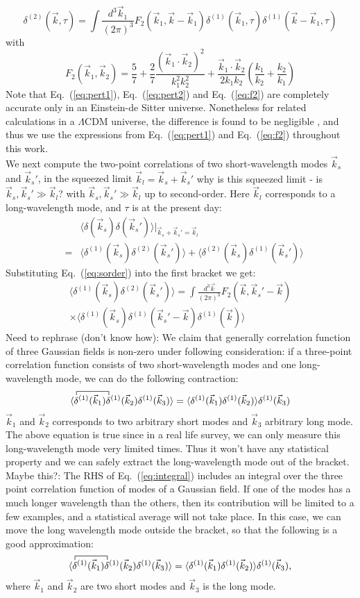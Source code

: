 \documentclass[prd,amsmath,amssymb,floatfix,superscriptaddress,nofootinbib,twocolumn]{revtex4-1}
\def\be{\begin{equation}}
\def\ee{\end{equation}}
\def\bea{\begin{eqnarray}}
\def\eea{\end{eqnarray}}
\newcommand{\vs}{\nonumber\\}
\newcommand{\vk}{\vec{k}}
\newcommand{\ec}[1]{Eq.~(\ref{eq:#1})}
\newcommand{\eql}[1]{\label{eq:#1}}
\newcommand{\peikai}[1]{{\color{blue} #1}}
\newcommand{\RC}[1]{{\color{darkorange} #1}}
\begin{document}
\be
{\delta}^{(2)}(\vk,\tau)=\int \frac{d^{3}\vk_{1}}{(2\pi)^3} F_2(\vk_1,\vk-\vk_1){\delta}^{(1)}(\vk_1,\tau) {\delta}^{(1)}(\vk-\vk_1,\tau) \eql{sorder} 
\ee
with 
\be
F_{2}(\vk_1,\vk_2)=\frac{5}{7}+\frac{2}{7}\frac{(\vk_1\cdot \vk_2)^2}{k_1^2 k_2^2}+\frac{\vk_1\cdot \vk_2}{2k_1k_2}(\frac{k_1}{k_2}+\frac{k_2}{k_1})\eql{f2}
\ee
Note that \ec{pert1}, \ec{pert2} and \ec{f2} are completely accurate only in an Einstein-de Sitter universe. Nonetheless for related calculations in a $\Lambda$CDM universe, the difference is found to be negligible \cite{Takahashi:2008to}, and thus we use the expressions from \ec{pert1} and \ec{f2} throughout this work.\\
We next compute the two-point correlations of two short-wavelength modes $\vk_s$ and $\vk_s'$, in the squeezed limit $\vk_l=\vk_s+\vk_s'$ \RC{why is this squeezed limit - is $\vk_s,\vk_s' \gg \vk_l$?}\peikai{with $\vk_s,\vk_s' \gg \vk_l$} up to second-order. Here $\vk_l$ corresponds to a long-wavelength mode, and $\tau$  is at the present day:
\bea 
&& \langle {\delta}(\vec{k}_s){\delta}(\vec{k}_s') \rangle|_{\vk_s+\vk_s'=\vk_l}\vs
&=&  \langle {\delta}^{(1)}(\vec{k}_s){\delta}^{(2)}(\vec{k}_s') \rangle+\langle {\delta}^{(2)}(\vec{k}_s){\delta}^{(1)}(\vec{k}_s') \rangle
\eea 
Substituting \ec{sorder} into the first bracket we get:
\bea 
\langle {\delta}^{(1)}(\vec{k}_s){\delta}^{(2)}(\vec{k}_s') \rangle =  \int \frac{d^3\vec{k}}{(2\pi)^3} F_2 (\vec{k},\vec{k}_s'-\vec{k})\vs
\times \langle {\delta}^{(1)}(\vec{k}_s){\delta}^{(1)}(\vec{k}_s'-\vec{k}){\delta}^{(1)}(\vec{k}) \rangle \eql{integral}
\eea 
\peikai{Need to rephrase (don't know how): We claim that generally correlation function of three Gaussian fields is non-zero under following consideration: if a three-point correlation function consists of two short-wavelength modes and one long-wavelength mode, we can do the following contraction:
\be 
\langle
\contraction{}{{\delta}}{{\delta^{(1)}\;\;\;\;}(}{}
{\delta^{(1)}}(\vk_{1}) {\delta^{(1)}}(\vk_{2}){\delta^{(1)}}(\vk_3) 
\rangle
=\langle {\delta^{(1)}}(\vk_{1}) {\delta^{(1)}}(\vk_{2}) \rangle {\delta^{(1)}}(\vk_3)  \eql{contraction}
\ee 
$\vk_1$ and $\vk_2$ corresponds to two arbitrary short modes and $\vk_3$ arbitrary long mode. The above equation is true since in a real life survey, we can only measure this long-wavelength mode very limited times. Thus it won't have any statistical property and we can safely extract the long-wavelength mode out of the bracket.}\\
\RC{Maybe this?: The RHS of \ec{integral} includes an integral over the three point correlation function of modes of a Gaussian field. If one of the modes has a much longer wavelength than the others, then its contribution will be limited to a few examples, and a statistical average will not take place.  In this case, we can move the long wavelength mode outside the bracket, so that the following is a good approximation:
\be 
\langle
\contraction{}{{\delta}}{{\delta^{(1)}\;\;\;\;}(}{}
{\delta^{(1)}}(\vk_{1}) {\delta^{(1)}}(\vk_{2}){\delta^{(1)}}(\vk_3) 
\rangle
=\langle {\delta^{(1)}}(\vk_{1}) {\delta^{(1)}}(\vk_{2}) \rangle {\delta^{(1)}}(\vk_3)  \eql{contraction},
\ee 
where $\vk_1$ and $\vk_2$ are two short modes and $\vk_3$ is the long mode.}\\
\end{document}
